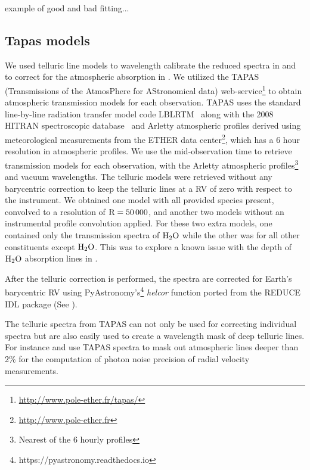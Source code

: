 

  example of good and bad fitting...


\subsection{Tapas models}
\label{subsec:tapas_models}
We used telluric line models to wavelength calibrate the reduced spectra in  and to correct for the atmospheric absorption in . We utilized the TAPAS (Transmissions of the AtmosPhere for AStronomical data) web-service\footnote{\url{http://www.pole-ether.fr/tapas/}} \citep{bertaux_tapas_2014} to obtain atmospheric transmission models for each observation. TAPAS uses the standard line-by-line radiation transfer model code LBLRTM~\citep{clough_linebyline_1995} along with the 2008 HITRAN spectroscopic database~\citep{rothman_hitran_2009} and Arletty atmospheric profiles derived using meteorological measurements from the ETHER data center\footnote{\url{http://www.pole-ether.fr}}, which has a 6 hour resolution in atmospheric profiles.
We use the mid-observation time to retrieve transmission models for each observation, with the Arletty atmospheric profiles\footnote{Nearest of the 6 hourly profiles} and vacuum wavelengths. The telluric models were retrieved without any barycentric correction to keep the telluric lines at a RV of zero with respect to the instrument. We obtained one model with all provided species present, convolved to a resolution of \(\rm R=50\,000 \), and another two models without an instrumental profile convolution applied. For these two extra models, one contained only the transmission spectra of \(\rm H_{2}O \) while the other was for all other constituents except \(\rm H_{2}O \). This was to explore a known issue \citep{bertaux_tapas_2014} with the depth of \(\rm H_{2}O \) absorption lines in .

After the telluric correction is performed, the spectra are corrected for Earth's barycentric RV using PyAstronomy's\footnote{https://pyastronomy.readthedocs.io} \emph{helcor} function ported from the REDUCE IDL package (See \citet[][]{piskunov_new_2002}).



The telluric spectra from TAPAS can not only be used for correcting individual spectra but are also easily used to create a wavelength mask of deep telluric lines. For instance \citet{figueira_radial_2016} and \citet{artigau_optical_2018} use TAPAS spectra to mask out atmospheric lines deeper than 2\% for the computation of photon noise precision of radial velocity measurements. 




